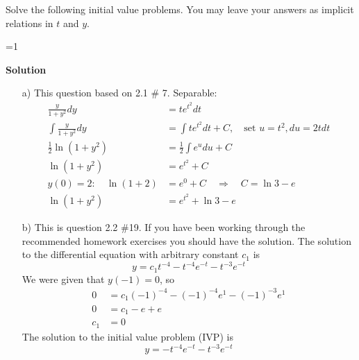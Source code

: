 \documentclass[12pt]{exam}
\newcommand{\sol}{1} %
\begin{document}
    


\newpage

\begin{questions}

 
\question[10] Solve the following initial value problems. You may leave your answers as implicit relations in $t$ and $y$. 


    \ifnum \sol=1
        {\color{DarkBlue} \textbf{Solution}\\ 
        \begin{enumerate}
            \item[a)] This question based on 2.1 \# 7. Separable: 
        \begin{align*}
            \frac{y}{1+y^2} dy &= te^{t^2} dt \\
            \int \frac{y}{1+y^2} dy &= \int te^{t^2} dt + C, \quad \text{set } u = t^2, du = 2t dt \\
            \frac12 \ln (1+y^2) &= \frac12 \int e^u du + C \\
             \ln (1+y^2) &= e^{t^2} + C \\
            y(0) = 2: \quad \ln (1 + 2) &= e^0 + C \quad \Rightarrow \quad C = \ln 3 - e \\
            \ln( 1 + y^2) &= e^{t^2} + \ln 3 - e
        \end{align*}
        
        \item[b)] This is question 2.2 \#19. If you have been working through the recommended homework exercises you should have the solution. The solution to the differential equation with arbitrary constant $c_1$ is $$y = c_1t^{-4} - t^{-4} e^{-t} - t^{-3}e^{-t}$$
        We were given that $y(-1) = 0$, so
        \begin{align*}
            0 &= c_1(-1)^{-4} - (-1)^{-4} e^{1} - (-1)^{-3}e^{1} \\
            0 &= c_1 - e + e \\
            c_1 &= 0
        \end{align*}
        The solution to the initial value problem (IVP) is
        $$y = - t^{-4} e^{-t} - t^{-3}e^{-t}$$
        

\end{enumerate}}
\end{questions}
\end{document}
